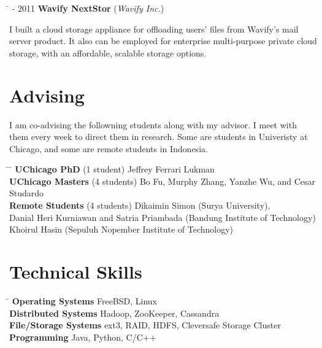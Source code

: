 \documentclass[10pt]{article} %
\begin{document}
\begin{tabbing}
\hspace{2.5cm} \=  - 2011 \>\+ \textbf{Wavify NextStor} (\textit{Wavify Inc.}) \\
\begin{minipage}{\smallertextwidth}
I built a cloud storage appliance for offloading users' files from Wavify's
mail server product. It also can be employed for enterprise multi-purpose
private cloud storage, with an affordable, scalable storage options.
\end{minipage}
\end{tabbing}


\section{Advising}

I am co-advising the followning students along with my advisor. I meet with them
every week to direct them in research. Some are students in Univeristy at
Chicago, and some are remote students in Indonesia.
\begin{tabbing}
\hspace{3.5cm} \= \hspace{2.5cm} \= \kill
\textbf{UChicago PhD} \> (1 student) \> Jeffrey Ferrari Lukman\\
\textbf{UChicago Masters} \> (4 students) \> Bo Fu, Murphy Zhang, Yanzhe Wu, and Cesar Studardo\\
\textbf{Remote Students} \> (4 students) \> Dikaimin Simon (Surya University),\\
\> \>Danial Heri Kurniawan and Satria Priambada (Bandung Institute of Technology)\\
\> \>Khoirul Hasin (Sepuluh Nopember Institute of Technology)
\end{tabbing}



\section{Technical Skills}

\begin{tabbing}
\hspace{4cm} \= \kill
\textbf{Operating Systems} \> FreeBSD, Linux \\
\textbf{Distributed Systems} \> Hadoop, ZooKeeper, Cassandra \\
\textbf{File/Storage Systems} \> ext3, RAID, HDFS, Cleversafe Storage Cluster\\
\textbf{Programming} \> Java, Python, C/C++
\end{tabbing}
\end{document}
